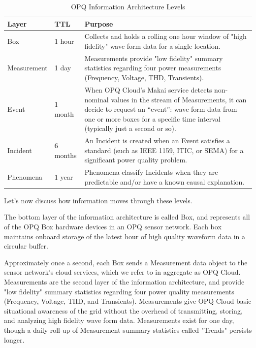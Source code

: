 \begin{table}[H]
\caption{OPQ Information Architecture Levels}
\centering
\begin{tabular}{llp{4in}}
\toprule
\textbf{Layer}	& \textbf{TTL}	& \textbf{Purpose}\\
\midrule
Box		& 1 hour			& Collects and holds a rolling one hour window of "high fidelity" wave form data for a single location.\\
Measurement		& 1 day			& Measurements provide "low fidelity" summary statistics regarding four power measurements (Frequency, Voltage, THD, Transients). \\
Event & 1 month & When OPQ Cloud's Makai service detects non-nominal values in the stream of Measurements, it can decide to request an ``event'': wave form data from one or more boxes for a specific time interval (typically just a second or so). \\
Incident & 6 months & An Incident is created when an Event satisfies a standard (such as IEEE 1159, ITIC, or SEMA) for a significant power quality problem.\\
Phenomena & 1 year & Phenomena classify Incidents when they are predictable and/or have a known causal explanation. \\
\bottomrule
\end{tabular}
\label{fig:information-architecture}
\end{table}

Let's now discuss how information moves through these levels.

The bottom layer of the information architecture is called Box, and represents all of the OPQ Box hardware devices in an OPQ sensor network. Each box maintains onboard storage of the latest hour of high quality waveform data in a circular buffer.

Approximately once a second, each Box sends a Measurement data object to the sensor network's cloud services, which we refer to in aggregate as OPQ Cloud. Measurements are the second layer of the information architecture, and provide "low fidelity" summary statistics regarding four power quality measurements (Frequency, Voltage, THD, and Transients). Measurements give OPQ Cloud basic situational awareness of the grid without the overhead of transmitting, storing, and analyzing high fidelity wave form data. Measurements exist for one day, though a daily roll-up of Measurement summary statistics called "Trends" persists longer.

